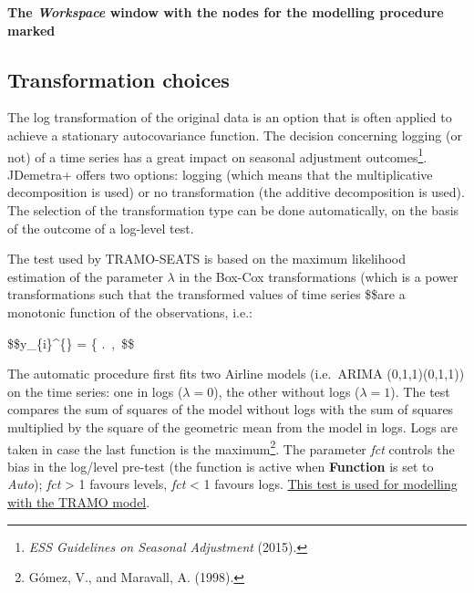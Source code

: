 \documentclass[
  letterpaper,
  DIV=11,
  numbers=noendperiod]{scrreprt}
\begin{document}
\textbf{The \emph{Workspace} window with the nodes for the modelling
procedure marked}

\hypertarget{transformation-choices}{%
\subsection{Transformation choices}\label{transformation-choices}}

The log transformation of the original data is an option that is often
applied to achieve a stationary autocovariance function. The decision
concerning logging (or not) of a time series has a great impact on
seasonal adjustment outcomes\footnote{\emph{ESS Guidelines on Seasonal
  Adjustment} (2015).}. JDemetra+ offers two options: logging (which
means that the multiplicative decomposition is used) or no
transformation (the additive decomposition is used). The selection of
the transformation type can be done automatically, on the basis of the
outcome of a log-level test.

The test used by TRAMO-SEATS is based on the maximum likelihood
estimation of the parameter \(\lambda\) in the Box-Cox transformations
(which is a power transformations such that the transformed values of
time series \$\$are a monotonic function of the observations,
i.e.:

\$\$y\_\{i\}\^{}\{\alpha\} = \left\{
 \right.~,~\lambda {}\$\$

The automatic procedure first fits two Airline models (i.e.~ARIMA
(0,1,1)(0,1,1)) on the time series: one in logs (\(\lambda = 0\)), the
other without logs (\(\lambda = 1\)). The test compares the sum of
squares of the model without logs with the sum of squares multiplied by
the square of the geometric mean from the model in logs. Logs are taken
in case the last function is the maximum\footnote{Gómez, V., and
  Maravall, A. (1998).}. The parameter \emph{fct} controls the bias in
the log/level pre-test (the function is active when \textbf{Function} is
set to \emph{Auto}); \emph{fct} \textgreater{} 1 favours levels,
\emph{fct} \textless{} 1 favours logs.
\protect\hyperlink{transformation}{This test is used for modelling with
the TRAMO model}.
\end{document}
